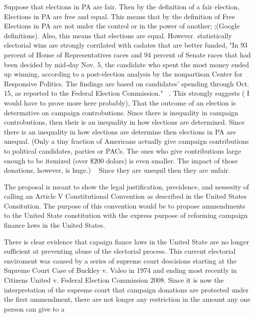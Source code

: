 \documentclass[11pt]{article} %
\begin{document}
\begin{itemize}
Suppose that elections in PA are fair. Then  by the definition of a fair election, Elections in PA are free and equal. This means that by the definition of Free Elections in PA are not under the control or in the power of another; ;(Google definitions).   Also, this means that elections are equal.  However. statistically electorial wins are strongly corrilated with cadates that are better funded, "In 93 percent of House of Representatives races and 94 percent of Senate races that had been decided by mid-day Nov. 5, the candidate who spent the most money ended up winning, according to a post-election analysis by the nonpartisan Center for Responsive Politics. The findings are based on candidates' spending through Oct. 15, as reported to the Federal Election Commission." ~\cite{OpenSecretsWins}.  This strongly suggests ( I would have to prove more here probably), That the outcome of an election is determative on campaign controbutions.  Since there is inequality in campaign controbutions, then their is an inequality in how elections are determined. Since there is an inequality in how elections are determine then elections in PA are unequal.    (Only a tiny fraction of Americans actually give campaign contributions to political candidates, parties or PACs. The ones who give contributions large enough to be itemized (over $\$200$ dolars) is even smaller. The impact of those donations, however, is huge.) ~\cite{OpenSecretsDemographics13}  Since they are unequil then they are unfair. 


\end{itemize}
 
The proposal is meant to show the legal justification,  precidence, and nessesity of calling an Article V Constitutional Convention as described in the United States Consitution.  The purpose of this convention would be to propose ammendments to the United State constitution with the express purpose of reforming campaign finance laws in the United States. 

There is clear evidence that capaign fiance laws in the United State are no longer sufficient at preventing abuse of the electorial process.  This current electorial enviroment was caused by a series of supreme court descisions starting at the Supreme Court Case of Buckley v. Valeo in 1974 and ending most recently in Citizens United v. Federal Election Commission 2008.  Since it is now the interpretation of the supreme court that campaign donations are protected under the first ammendment, there are not longer any restriction in the amount any one person can give to a
\end{document}

